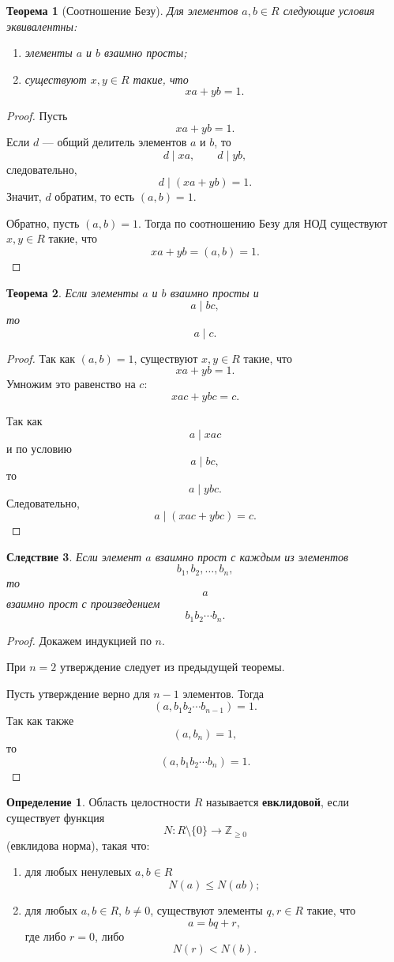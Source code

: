 \documentclass[12pt, a4paper]{article}
\newtheorem{theorem}{Теорема}
\newtheorem{corollary}[theorem]{Следствие}
\theoremstyle{definition}
\newtheorem{definition}{Определение}
\theoremstyle{remark}
\begin{document}
\begin{theorem}[Соотношение Безу]
	Для элементов $a,b \in R$ следующие условия эквивалентны:
	\begin{enumerate}
		\item элементы $a$ и $b$ взаимно просты;
		\item существуют $x,y \in R$ такие, что
		\[
		xa+yb=1.
		\]
	\end{enumerate}
\end{theorem}

\begin{proof}
	Пусть
	\[
	xa+yb=1.
	\]
	Если $d$ --- общий делитель элементов $a$ и $b$, то
	\[
	d \mid xa,\qquad d \mid yb,
	\]
	следовательно,
	\[
	d \mid (xa+yb)=1.
	\]
	Значит, $d$ обратим, то есть $(a,b)=1$.
	
	Обратно, пусть $(a,b)=1$.
	Тогда по соотношению Безу для НОД существуют $x,y \in R$ такие, что
	\[
	xa+yb=(a,b)=1.
	\]
\end{proof}

\begin{theorem}
	Если элементы $a$ и $b$ взаимно просты и
	\[
	a \mid bc,
	\]
	то
	\[
	a \mid c.
	\]
\end{theorem}

\begin{proof}
	Так как $(a,b)=1$, существуют $x,y \in R$ такие, что
	\[
	xa+yb=1.
	\]
	Умножим это равенство на $c$:
	\[
	xac+ybc=c.
	\]
	
	Так как
	\[
	a \mid xac
	\]
	и по условию
	\[
	a \mid bc,
	\]
	то
	\[
	a \mid ybc.
	\]
	Следовательно,
	\[
	a \mid (xac+ybc)=c.
	\]
\end{proof}

\begin{corollary}
	Если элемент $a$ взаимно прост с каждым из элементов
	\[
	b_1,b_2,\ldots,b_n,
	\]
	то
	\[
	a
	\]
	взаимно прост с произведением
	\[
	b_1b_2\cdots b_n.
	\]
\end{corollary}

\begin{proof}
	Докажем индукцией по $n$.
	
	При $n=2$ утверждение следует из предыдущей теоремы.
	
	Пусть утверждение верно для $n-1$ элементов.
	Тогда
	\[
	(a,b_1b_2\cdots b_{n-1})=1.
	\]
	Так как также
	\[
	(a,b_n)=1,
	\]
	то
	\[
	(a,b_1b_2\cdots b_n)=1.
	\]
\end{proof}

\begin{definition}
	Область целостности $R$ называется \textbf{евклидовой}, если существует функция
	\[
	N: R\setminus\{0\}\to\mathbb{Z}_{\ge0}
	\]
	(евклидова норма), такая что:
	\begin{enumerate}
		\item для любых ненулевых $a,b \in R$
		\[
		N(a)\le N(ab);
		\]
		
		\item для любых $a,b \in R$, $b\ne0$, существуют элементы
		$q,r \in R$ такие, что
		\[
		a=bq+r,
		\]
		где либо $r=0$, либо
		\[
		N(r)<N(b).
		\]
	\end{enumerate}
\end{definition}
\end{document}

